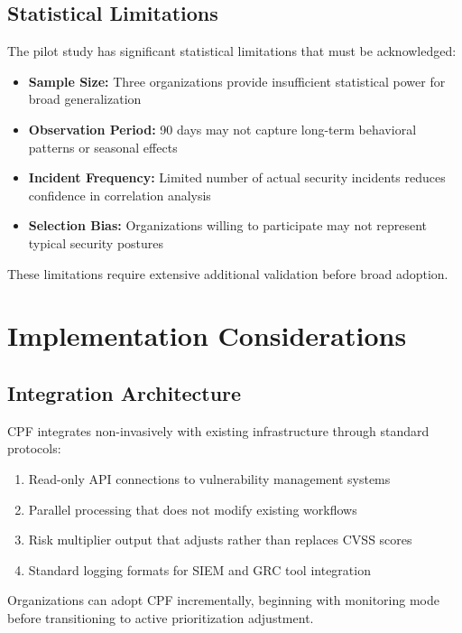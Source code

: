 \documentclass[10pt, twocolumn]{article}
\begin{document}
\subsection{Statistical Limitations}

The pilot study has significant statistical limitations that must be acknowledged:

\begin{itemize}
\item \textbf{Sample Size:} Three organizations provide insufficient statistical power for broad generalization
\item \textbf{Observation Period:} 90 days may not capture long-term behavioral patterns or seasonal effects
\item \textbf{Incident Frequency:} Limited number of actual security incidents reduces confidence in correlation analysis
\item \textbf{Selection Bias:} Organizations willing to participate may not represent typical security postures
\end{itemize}

These limitations require extensive additional validation before broad adoption.

\section{Implementation Considerations}

\subsection{Integration Architecture}

CPF integrates non-invasively with existing infrastructure through standard protocols:

\begin{enumerate}
\item Read-only API connections to vulnerability management systems
\item Parallel processing that does not modify existing workflows
\item Risk multiplier output that adjusts rather than replaces CVSS scores
\item Standard logging formats for SIEM and GRC tool integration
\end{enumerate}

Organizations can adopt CPF incrementally, beginning with monitoring mode before transitioning to active prioritization adjustment.
\end{document}
